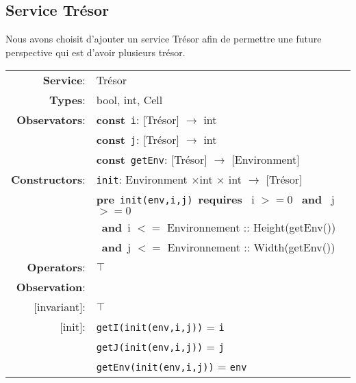 \documentclass{article}
\begin{document}
\subsection{Service Trésor}
Nous avons choisit d'ajouter un service Trésor afin de permettre une future perspective qui est d'avoir plusieurs trésor.
\\
\begin{tabular}{rl}
\textbf{Service}: & \textrm{Trésor}  \\
\textbf{Types}: & \textrm{bool}, \textrm{int}, \textrm{Cell}  \\
\textbf{Observators}: & \textbf{const}~\texttt{i}: \textrm{[Trésor]} $\rightarrow$ \textrm{int} \\
& \textbf{const}~\texttt{j}: \textrm{[Trésor]} $\rightarrow$ \textrm{int} \\
& \textbf{const}~\texttt{getEnv}: \textrm{[Trésor]} $\rightarrow$ \textrm{[Environment]} \\
\textbf{Constructors}: & \texttt{init}: \textrm{Environment} $\times$\textrm{int} $\times$ \textrm{int} $\rightarrow$ \textrm{[Trésor]} \\
& \quad\quad \textbf{pre}~\texttt{init(env,i,j)}~\textbf{requires}~ i $>=0$ ~\textbf{and}~ j$>=0$ \\ & \quad\quad\quad~\textbf{and}~i $<=$ Environnement :: Height(getEnv()) \\
& \quad\quad\quad~\textbf{and}~j $<=$ Environnement :: Width(getEnv()) \\
\textbf{Operators}: & $\top$ \\
       \textbf{Observation}: \\
       $[$invariant$]$: & $\top$ \\
       $[$init$]$: & \texttt{getI(init(env,i,j))} = \texttt{i} \\
       & \texttt{getJ(init(env,i,j))} = \texttt{j} \\
       & \texttt{getEnv(init(env,i,j))} = \texttt{env} \\
\end{tabular}
\end{document}
